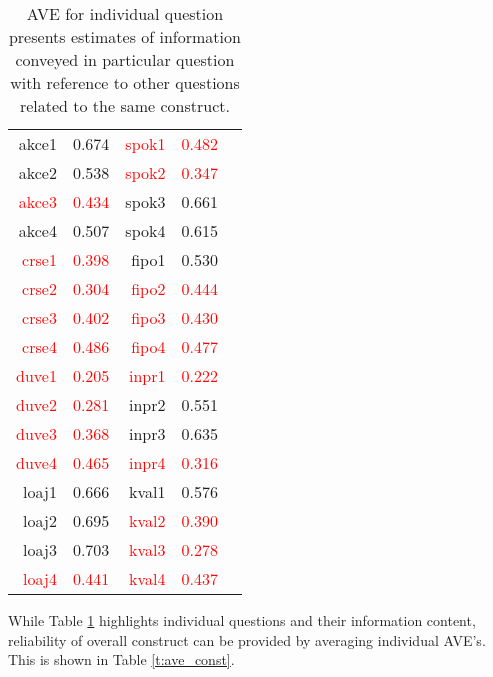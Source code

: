 \documentclass[10pt,a4paper]{article}
\begin{document}
\begin{table}[htbp]
  \centering
 \caption{AVE for individual question presents estimates of information conveyed in particular question with reference to other questions related to the same construct.}
    \begin{tabular}{r|r||r|rr}\hline
    akce1 & 0.674        & \textcolor{Red}{spok1} & \textcolor{Red}{0.482} \\
    akce2 & 0.538        & \textcolor{Red}{spok2} & \textcolor{Red}{0.347} \\
    \textcolor{Red}{akce3} & \textcolor{Red}{0.434}        & spok3 & 0.661 \\
    akce4 & 0.507        & spok4 & 0.615 \\\hline
    \textcolor{Red}{crse1} & \textcolor{Red}{0.398}        & fipo1 & 0.530 \\
    \textcolor{Red}{crse2} & \textcolor{Red}{0.304}        & \textcolor{Red}{fipo2} & \textcolor{Red}{0.444} \\
    \textcolor{Red}{crse3} & \textcolor{Red}{0.402}        & \textcolor{Red}{fipo3} & \textcolor{Red}{0.430} \\
    \textcolor{Red}{crse4} & \textcolor{Red}{0.486} &       \textcolor{Red}{fipo4} & \textcolor{Red}{0.477} \\\hline
    \textcolor{Red}{duve1}  & \textcolor{Red}{0.205}        & \textcolor{Red}{inpr1} & \textcolor{Red}{0.222} \\
    \textcolor{Red}{duve2} & \textcolor{Red}{0.281}        & inpr2 & 0.551 \\
    \textcolor{Red}{duve3} & \textcolor{Red}{0.368}        & inpr3 & 0.635 \\
    \textcolor{Red}{duve4} & \textcolor{Red}{0.465}        & \textcolor{Red}{inpr4} & \textcolor{Red}{0.316} \\\hline
    loaj1 & 0.666        & kval1 & 0.576 \\
    loaj2 & 0.695        & \textcolor{Red}{kval2} & \textcolor{Red}{0.390} \\
    loaj3 & 0.703        & \textcolor{Red}{kval3} & \textcolor{Red}{0.278} \\
    \textcolor{Red}{loaj4} & \textcolor{Red}{0.441}        & \textcolor{Red}{kval4} & \textcolor{Red}{0.437} \\\hline
    \end{tabular}%
  \label{t:ave_ind}%
\end{table}%

While Table \ref{t:ave_ind} highlights individual questions and their information content, reliability of overall construct can be provided by averaging individual AVE's. This is shown in Table \ref{t:ave_const}.
\end{document}
